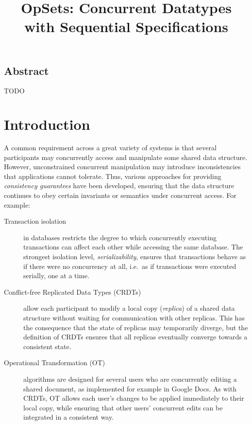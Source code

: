\documentclass[11pt]{article}
\begin{document}
\sloppy
\title{OpSets: Concurrent Datatypes with Sequential Specifications}
\author{}
\date{}
\maketitle

\subsection*{Abstract}
TODO

\section{Introduction}

A common requirement across a great variety of systems is that several participants may concurrently access and manipulate some shared data structure.
However, unconstrained concurrent manipulation may introduce inconsistencies that applications cannot tolerate.
Thus, various approaches for providing \emph{consistency guarantees} have been developed, ensuring that the data structure continues to obey certain invariants or semantics under concurrent access. For example:

\begin{description}
\item[Transaction isolation] in databases restricts the degree to which concurrently executing transactions can affect each other while accessing the same database.
The strongest isolation level, \emph{serializability}, ensures that transactions behave as if there were no concurrency at all, i.e.\ as if transactions were executed serially, one at a time.

\item[Conflict-free Replicated Data Types (CRDTs)] allow each participant to modify a local copy (\emph{replica}) of a shared data structure without waiting for communication with other replicas.
This has the consequence that the state of replicas may temporarily diverge, but the definition of CRDTs ensures that all replicas eventually converge towards a consistent state.

\item[Operational Transformation (OT)] algorithms are designed for several users who are concurrently editing a shared document, as implemented for example in Google Docs.
As with CRDTs, OT allows each user's changes to be applied immediately to their local copy, while ensuring that other users' concurrent edits can be integrated in a consistent way.
\end{description}
\end{document}
